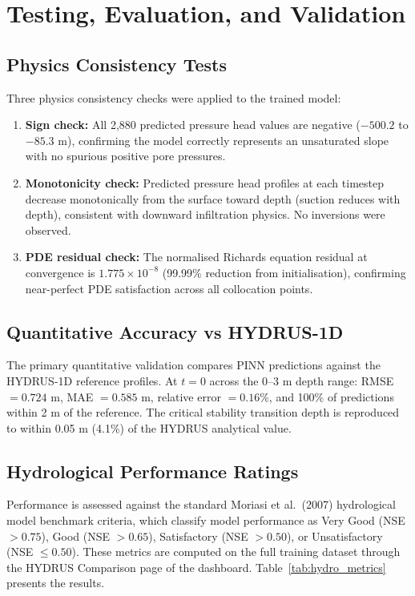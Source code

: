 \documentclass[12pt]{report}
\begin{document}
\section{Testing, Evaluation, and Validation}

\subsection{Physics Consistency Tests}

Three physics consistency checks were applied to the trained model:

\begin{enumerate}
    \item \textbf{Sign check:} All 2,880 predicted pressure head
    values are negative ($-500.2$ to $-85.3$ m), confirming the
    model correctly represents an unsaturated slope with no
    spurious positive pore pressures.

    \item \textbf{Monotonicity check:} Predicted pressure head
    profiles at each timestep decrease monotonically from the
    surface toward depth (suction reduces with depth), consistent
    with downward infiltration physics. No inversions were observed.

    \item \textbf{PDE residual check:} The normalised Richards
    equation residual at convergence is $1.775 \times 10^{-8}$
    (99.99\% reduction from initialisation), confirming near-perfect
    PDE satisfaction across all collocation points.
\end{enumerate}

\subsection{Quantitative Accuracy vs HYDRUS-1D}

The primary quantitative validation compares PINN predictions against
the HYDRUS-1D reference profiles. At $t = 0$ across the 0--3 m
depth range: RMSE $= 0.724$ m, MAE $= 0.585$ m, relative error
$= 0.16\%$, and 100\% of predictions within 2 m of the reference.
The critical stability transition depth is reproduced to within
0.05 m (4.1\%) of the HYDRUS analytical value.

\subsection{Hydrological Performance Ratings}

Performance is assessed against the standard Moriasi et al.\ (2007)
hydrological model benchmark criteria, which classify model
performance as Very Good (NSE $> 0.75$), Good (NSE $> 0.65$),
Satisfactory (NSE $> 0.50$), or Unsatisfactory (NSE $\leq 0.50$).
These metrics are computed on the full training dataset through the
HYDRUS Comparison page of the dashboard. Table~\ref{tab:hydro_metrics}
presents the results.
\end{document}
